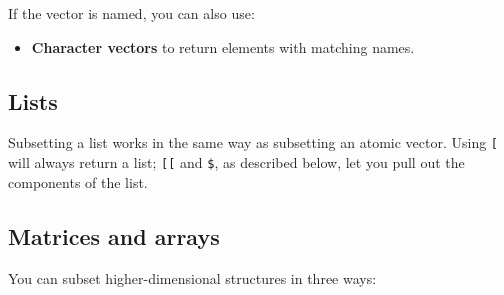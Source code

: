 If the vector is named, you can also use:

\begin{itemize}
\item
  \textbf{Character vectors} to return elements with matching names.

\begin{Shaded}
\begin{Highlighting}[]
\StringTok{ }\NormalTok{(x, letters[}\NormalTok{:}\NormalTok{]))}
\NormalTok{y[}\NormalTok{(}\NormalTok{, }\NormalTok{, }\NormalTok{)]}

\NormalTok{y[}\NormalTok{(}\NormalTok{, }\NormalTok{, }\NormalTok{)]}

\CommentTok{# When subsetting with [ names are always matched exactly}
\StringTok{ }\NormalTok{(} \NormalTok{, } \NormalTok{)}
\NormalTok{z[}\NormalTok{(}\NormalTok{, }\NormalTok{)]}
\end{Highlighting}
\end{Shaded}
\end{itemize}

\subsection{Lists}

Subsetting a list works in the same way as subsetting an atomic vector.
Using \texttt{{[}} will always return a list; \texttt{{[}{[}} and
\texttt{\$}, as described below, let you pull out the components of the
list.  

\subsection{Matrices and arrays}\label{matrix-subsetting}

You can subset higher-dimensional structures in three ways:
 

